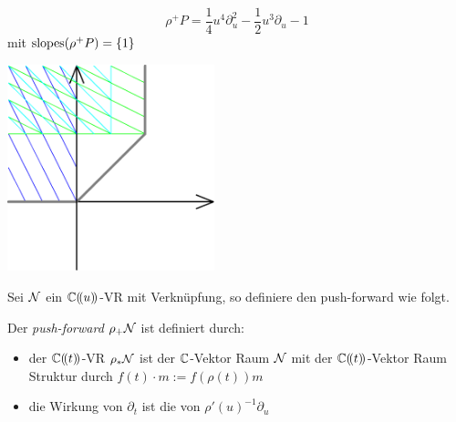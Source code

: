 \begin{exmp}
  \begin{minipage}[hbt]{0,39\textwidth}
    \[ \rho^+P= \frac{1}{4}u^4\partial_u^2 -\frac{1}{2}u^3\partial_u-1 \]
    mit $ \operatorname{slopes}(\rho^+P)=\{1\} $
  \end{minipage}
  \begin{minipage}[hbt]{0,59\textwidth}
    \begin{center}
      \includegraphics[width=6cm]{img/formal_b_pb.png}
    \end{center}
  \end{minipage}
\end{exmp}

Sei $\mathcal{N}$ ein $\mathbb{C}(\!(u)\!)$-VR mit Verknüpfung, so definiere den push-forward
wie folgt.
\begin{defn}
  \cite[1.a]{sabbah_Fourier-local}
  Der \emph{push-forward} $\rho_+\mathcal{N}$ ist definiert durch:
  \begin{itemize}
    \item der $\mathbb{C}(\!(t)\!)$-VR $\rho_*\mathcal{N}$ ist der $\mathbb{C}$-Vektor Raum $\mathcal{N}$ mit
      der $\mathbb{C}(\!(t)\!)$-Vektor Raum Struktur durch $f(t)\cdot m:=f(\rho(t))m$
    \item die Wirkung von $\partial_t$ ist die von $\rho'(u)^{-1}\partial_u$
  \end{itemize}
\end{defn}

